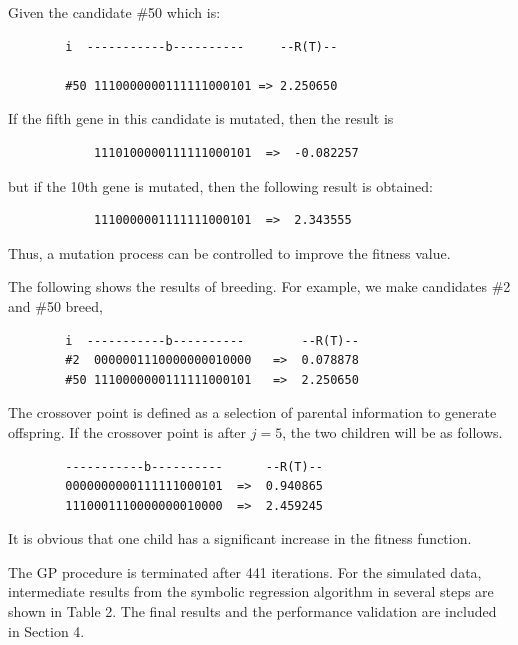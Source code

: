 \documentclass[10pt,journal,compsoc]{IEEEtran}
\begin{document}
		Given the candidate \#50 which is:
		\begin{verbatim}
		i  -----------b----------     --R(T)--
		
		#50 1110000000111111000101 => 2.250650
		\end{verbatim}
		If the fifth gene in this candidate is mutated, then the result is
		\begin{verbatim}
			1110100000111111000101  =>  -0.082257
		\end{verbatim}
		but if the 10th gene is mutated, then the following result is obtained:
		\begin{verbatim}
			1110000001111111000101  =>  2.343555
		\end{verbatim}
		Thus, a mutation process can be controlled to improve the fitness value.
		
The following shows the results of breeding. For example, we make candidates \#2 and \#50 breed, 
		\begin{verbatim}
		i  -----------b----------        --R(T)--
		#2  0000001110000000010000   =>  0.078878
		#50 1110000000111111000101   =>  2.250650
		\end{verbatim}
		The crossover point is defined as a selection of parental information to generate offspring. 
		If the crossover point is after $j=5$, the two children will be as follows. 
		\begin{verbatim}
		-----------b----------      --R(T)--
		0000000000111111000101  =>  0.940865
		1110001110000000010000  =>  2.459245
		\end{verbatim}
		It is obvious that one child has a significant increase in the fitness function.

The GP procedure is terminated after 441 iterations. For the simulated data, intermediate results from the symbolic regression algorithm in several steps are shown in Table 2. The final results and the performance validation are included in Section 4. 
\end{document}
